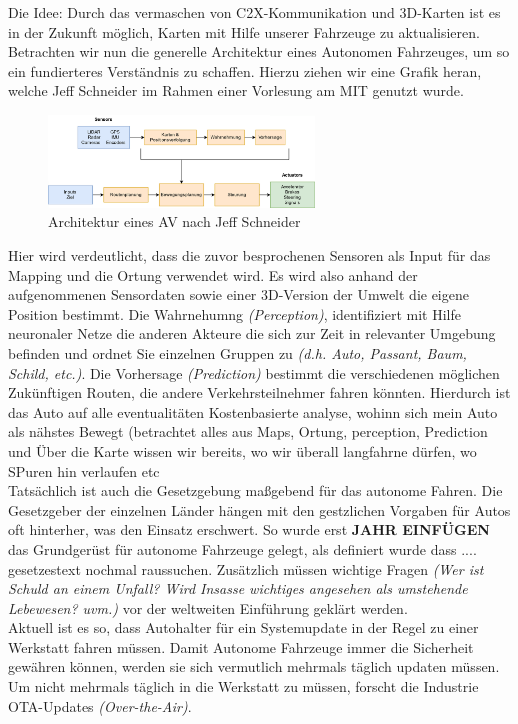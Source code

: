 Die Idee: Durch das vermaschen von C2X-Kommunikation und 3D-Karten ist es in der Zukunft möglich, Karten mit Hilfe unserer Fahrzeuge zu aktualisieren.\\
Betrachten wir nun die generelle Architektur eines Autonomen Fahrzeuges, um so ein fundierteres Verständnis zu schaffen. Hierzu ziehen wir eine Grafik heran, welche Jeff Schneider im Rahmen einer Vorlesung am MIT genutzt wurde.\\
\begin{figure}
  \begin{center}
    \includegraphics[width=0.63\textwidth]{pictures/arichtecture_AV.png}
  \end{center}
  \caption{Architektur eines AV nach Jeff Schneider}
\end{figure}
Hier wird verdeutlicht, dass die zuvor besprochenen Sensoren als Input für das Mapping und die Ortung verwendet wird. Es wird also anhand der aufgenommenen Sensordaten  sowie einer 3D-Version der Umwelt die eigene Position bestimmt. Die Wahrnehumng \textit{(Perception)}, identifiziert mit Hilfe neuronaler Netze die anderen Akteure die sich zur Zeit in relevanter Umgebung befinden und ordnet Sie einzelnen Gruppen zu \textit{(d.h. Auto, Passant, Baum, Schild, etc.)}. Die Vorhersage \textit{(Prediction)} bestimmt die verschiedenen möglichen Zukünftigen Routen, die andere Verkehrsteilnehmer fahren könnten. Hierdurch ist das Auto auf alle eventualitäten 
Kostenbasierte analyse, wohinn sich mein Auto als nähstes Bewegt (betrachtet alles aus Maps, Ortung, perception, Prediction und
Über die Karte wissen wir bereits, wo wir überall langfahrne dürfen, wo SPuren hin verlaufen etc 
\\
Tatsächlich ist auch die Gesetzgebung maßgebend für das autonome Fahren. Die Gesetzgeber der einzelnen Länder hängen mit den gestzlichen Vorgaben für Autos oft hinterher, was den Einsatz erschwert.\cite{b20} \cite{b21} So wurde erst \textbf{JAHR EINFÜGEN} das Grundgerüst für autonome Fahrzeuge gelegt, als definiert wurde dass .... gesetzestext nochmal raussuchen. Zusätzlich müssen wichtige Fragen \textit{(Wer ist Schuld an einem Unfall? Wird Insasse wichtiges angesehen als umstehende Lebewesen? uvm.)} vor der weltweiten Einführung geklärt werden.\\
Aktuell ist es so, dass Autohalter für ein Systemupdate in der Regel zu einer Werkstatt fahren müssen. Damit Autonome Fahrzeuge immer die Sicherheit gewähren können, werden sie sich vermutlich mehrmals täglich updaten müssen. Um nicht mehrmals täglich in die Werkstatt zu müssen, forscht die Industrie OTA-Updates \textit{(Over-the-Air)}.
